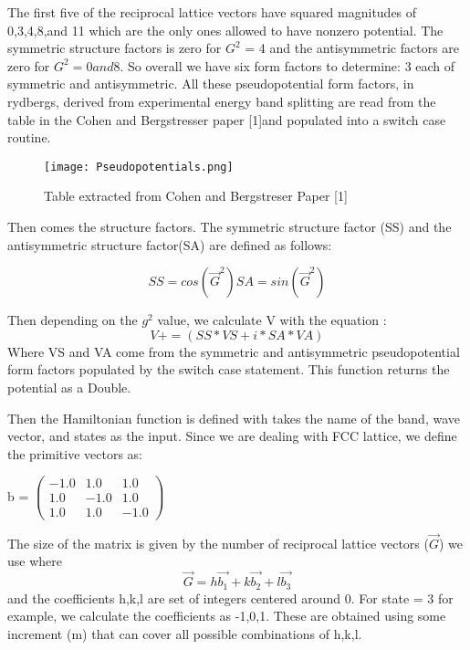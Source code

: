 \documentclass[%
 reprint,
 amsmath,amssymb,
 aps,
]{revtex4-2}
\begin{document}
The first five of the reciprocal lattice vectors have squared magnitudes of 0,3,4,8,and 11 which are the only ones allowed to have nonzero potential. The symmetric structure factors is zero for $G^2$ = 4 and the antisymmetric factors are zero for $G^2 = 0 and 8 $. So overall we have six form factors to determine: 3 each of symmetric and antisymmetric. All these pseudopotential form factors, in rydbergs, derived from experimental energy band splitting are read from the table in the Cohen and Bergstresser paper [1]and populated into a switch case routine. 

\begin{figure}[H]
\texttt{[image: Pseudopotentials.png]}%
\caption{\label{fig:Hamiltonian} Table extracted from Cohen and Bergstreser Paper [1]}
\end{figure}

Then comes the structure factors. The symmetric structure factor (SS) and the antisymmetric structure factor(SA) are defined as follows: 

\begin{equation}
    SS = cos(\vec{G}^2)
    SA = sin(\vec{G}^2)
\end{equation}

Then depending on the $g^2$ value, we calculate V with the equation : 
\begin{equation}
    V += (SS*VS + i *SA*VA)
\end{equation}
Where VS and VA come from the symmetric and antisymmetric pseudopotential form factors populated by the switch case statement. This function returns the potential as a Double. 

Then the Hamiltonian function is defined with takes the name of the band, wave vector, and states as the input. 
Since we are dealing with FCC lattice, we define the primitive vectors as: 

b = $\begin{pmatrix}
-1.0 & 1.0 & 1.0\\
1.0 & -1.0 & 1.0\\
1.0 & 1.0 & -1.0
\end{pmatrix}$

The size of the matrix is given by the number of reciprocal lattice vectors ($\vec{G}$) we use where
\begin{equation}
    \vec{G} = h \vec{b_1} + k \vec{b_2} + l \vec{b_3}
\end{equation}
and the coefficients h,k,l are set of integers centered around 0. For state = 3 for example, we calculate the coefficients as {-1,0,1}. These are obtained using some increment (m) that can cover all possible combinations of {h,k,l}. 
\end{document}
